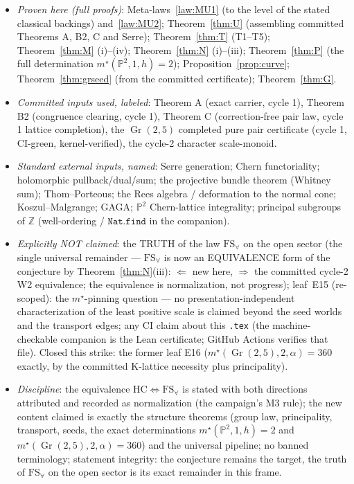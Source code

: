 \documentclass[11pt]{article}
\newcommand{\Z}{\mathbb{Z}}
\newcommand{\Pp}{\mathbb{P}}
\newcommand{\Gr}{\operatorname{Gr}}
\newcommand{\FS}{\mathrm{FS}_\forall}
\begin{document}
\begin{itemize}
\item \emph{Proven here (full proofs)}: Meta-laws~\ref{law:MU1}
(to the level of the stated classical backings) and~\ref{law:MU2};
Theorem~\ref{thm:U} (assembling committed Theorems A, B2, C and Serre);
Theorem~\ref{thm:T} (T1--T5); Theorem~\ref{thm:M} (i)--(iv);
Theorem~\ref{thm:N} (i)--(iii); Theorem~\ref{thm:P} (the full determination
$m^\star(\Pp^2,1,h)=2$); Proposition~\ref{prop:curve};
Theorem~\ref{thm:grseed} (from the committed certificate);
Theorem~\ref{thm:G}.
\item \emph{Committed inputs used, labeled}: Theorem A (exact carrier,
cycle 1), Theorem B2 (congruence clearing, cycle 1), Theorem C
(correction-free pair law, cycle 1 lattice completion), the $\Gr(2,5)$
completed pure pair certificate (cycle 1, CI-green, kernel-verified), the
cycle-2 character scale-monoid.
\item \emph{Standard external inputs, named}: Serre generation; Chern
functoriality; holomorphic pullback/dual/sum; the projective bundle theorem
(Whitney sum); Thom--Porteous; the Rees algebra / deformation to the normal
cone; Koszul--Malgrange; GAGA; $\Pp^2$ Chern-lattice integrality; principal
subgroups of $\Z$ (well-ordering / $\texttt{Nat.find}$ in the companion).
\item \emph{Explicitly NOT claimed}: the TRUTH of the law $\FS$ on the
open sector (the single universal remainder --- $\FS$ is now an EQUIVALENCE
form of the conjecture by Theorem~\ref{thm:N}(iii): $\Leftarrow$ new here,
$\Rightarrow$ the committed cycle-2 W2 equivalence; the equivalence is
normalization, not progress); leaf~E15 (re-scoped): the $m^\star$-pinning
question --- no presentation-independent characterization of the least
positive scale is claimed beyond the seed worlds and the transport edges;
any CI claim about this \texttt{.tex} (the machine-checkable companion is
the Lean certificate; GitHub Actions verifies that file).  Closed this
strike: the former leaf E16 ($m^\star(\Gr(2,5),2,\alpha)=360$ exactly,
by the committed K-lattice necessity plus principality).
\item \emph{Discipline}: the equivalence $\mathrm{HC}\iff\FS$ is stated
with both directions attributed and recorded as normalization (the campaign's
M3 rule); the new content claimed is exactly the structure theorems
(group law, principality, transport, seeds, the exact determinations
$m^\star(\Pp^2,1,h)=2$ and $m^\star(\Gr(2,5),2,\alpha)=360$) and the
universal pipeline; no banned terminology; statement integrity: the
conjecture remains the target, the truth of $\FS$ on the open sector is its
exact remainder in this frame.
\end{itemize}
\end{document}
